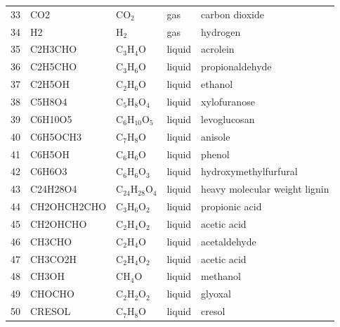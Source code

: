 \begin{center}
\begin{longtable}{cllll}
        33 & CO2            & CO$_2$                  & \cellcolor{purple!25}gas         & carbon dioxide \\
        34 & H2             & H$_2$                   & \cellcolor{purple!25}gas         & hydrogen \\
        35 & C2H3CHO        & C$_3$H$_4$O             & \cellcolor{blue!25}liquid        & acrolein \\
        36 & C2H5CHO        & C$_3$H$_6$O             & \cellcolor{blue!25}liquid        & propionaldehyde \\
        37 & C2H5OH         & C$_2$H$_6$O             & \cellcolor{blue!25}liquid        & ethanol \\
        38 & C5H8O4         & C$_5$H$_8$O$_4$         & \cellcolor{blue!25}liquid        & xylofuranose \\
        39 & C6H10O5        & C$_6$H$_{10}$O$_5$      & \cellcolor{blue!25}liquid        & levoglucosan \\
        40 & C6H5OCH3       & C$_7$H$_8$O             & \cellcolor{blue!25}liquid        & anisole \\
        41 & C6H5OH         & C$_6$H$_6$O             & \cellcolor{blue!25}liquid        & phenol \\
        42 & C6H6O3         & C$_6$H$_6$O$_3$         & \cellcolor{blue!25}liquid        & hydroxymethylfurfural \\
        43 & C24H28O4       & C$_{24}$H$_{28}$O$_4$   & \cellcolor{blue!25}liquid        & heavy molecular weight lignin \\
        44 & CH2OHCH2CHO    & C$_3$H$_6$O$_2$         & \cellcolor{blue!25}liquid        & propionic acid \\
        45 & CH2OHCHO       & C$_2$H$_4$O$_2$         & \cellcolor{blue!25}liquid        & acetic acid \\
        46 & CH3CHO         & C$_2$H$_4$O             & \cellcolor{blue!25}liquid        & acetaldehyde \\
        47 & CH3CO2H        & C$_2$H$_4$O$_2$         & \cellcolor{blue!25}liquid        & acetic acid \\
        48 & CH3OH          & CH$_4$O                 & \cellcolor{blue!25}liquid        & methanol \\
        49 & CHOCHO         & C$_2$H$_2$O$_2$         & \cellcolor{blue!25}liquid        & glyoxal \\
        50 & CRESOL         & C$_7$H$_8$O             & \cellcolor{blue!25}liquid        & cresol \\

\end{longtable}
\end{center}
